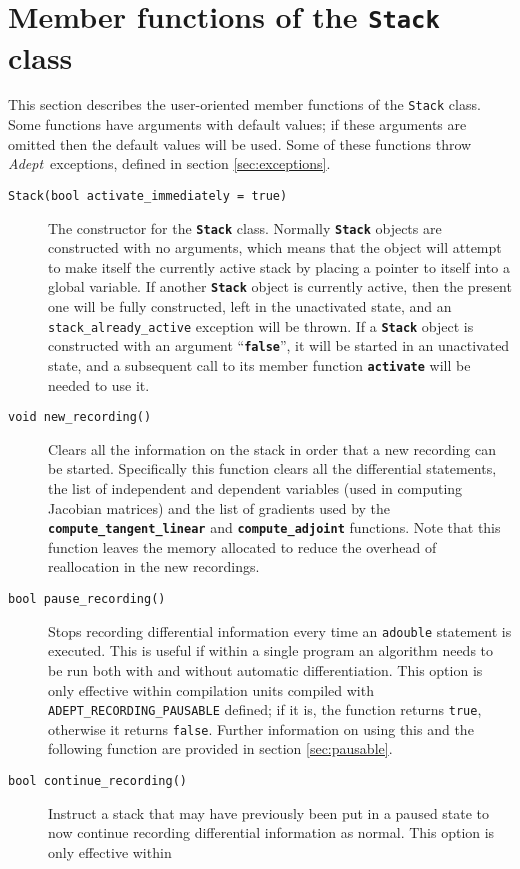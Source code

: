 \documentclass[a4,oneside]{book}
\def\codesize{\small}
\def\Adept{\emph{Adept}}
\def\code#1{{\codesize\texttt{#1}}}
\def\codebf#1{{\codesize\texttt{\textbf{#1}}}}
\def\citem#1{\item[{\codesize\texttt{#1}}]}
\def\codestyle#1{\texttt{#1}}
\begin{document}
\section{Member functions of the \codestyle{Stack} class}
\label{sec:stack}
This section describes the user-oriented member functions of the
\code{Stack} class. Some functions have arguments with default values;
if these arguments are omitted then the default values will be used.
Some of these functions throw \Adept\ exceptions, defined in section
\ref{sec:exceptions}.

\begin{description}
\citem{Stack(bool activate\_immediately = true)} The constructor for the
\codebf{Stack} class.  Normally \codebf{Stack} objects are constructed
with no arguments, which means that the object will attempt to make
itself the currently active stack by placing a pointer to itself into
a global variable.  If another \codebf{Stack} object is currently
active, then the present one will be fully constructed, left in the
unactivated state, and an \code{stack\_already\_active} exception
will be thrown.  If a \codebf{Stack} object is constructed with an
argument ``\codebf{false}'', it will be started in an unactivated
state, and a subsequent call to its member function \codebf{activate}
will be needed to use it.
%
\citem{void new\_recording()} Clears all the information on the stack
in order that a new recording can be started. Specifically this
function clears all the differential statements, the list of
independent and dependent variables (used in computing Jacobian
matrices) and the list of gradients used by the
\codebf{compute\_tangent\_linear} and \codebf{compute\_adjoint} functions.
Note that this function leaves the memory allocated to reduce the
overhead of reallocation in the new recordings.
%
\citem{bool pause\_recording()} Stops recording differential
  information every time an \code{adouble} statement is
  executed. This is useful if within a single program an algorithm
  needs to be run both with and without automatic
  differentiation. This option is only effective within compilation
  units compiled with \code{ADEPT\_RECORDING\_PAUSABLE} defined; if it is,
  the function returns \code{true}, otherwise it returns
  \code{false}. Further information on using this and the following
  function are provided in section \ref{sec:pausable}.
%
\citem{bool continue\_recording()} Instruct a stack that may have
previously been put in a paused state to now continue recording
differential information as normal.  This option is only effective within

\end{description}
\end{document}
